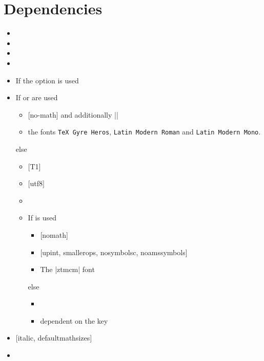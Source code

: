 \section{Dependencies}
\begin{multicols}{2}%
  \begin{itemize}[leftmargin=10pt]
    \item {}
    \item {}
    \item {}
    \item {}
    \item If the  option is used 
    \item If  or  are used
      \begin{itemize}[topsep=0pt]
        \item {} [no-math] and additionally
          \bverb||
        \item the fonts \texttt{TeX Gyre Heros}, \texttt{Latin Mod\-ern Roman}
          and \texttt{Latin Modern Mono}.
      \end{itemize}
      else
      \begin{itemize}[topsep=0pt]
        \item {} [T1]
        \item {} [utf8]
        \item {}
        \item If  is used
          \begin{itemize}[topsep=0pt]
            \item {} [nomath]
            \item {} [upint, smallerops, nosymbolsc, noamssymbols]
            \item The |ztmcm| font
          \end{itemize}
          else
          \begin{itemize}[topsep=0pt]
            \item {}
            \item {} dependent on the  key
          \end{itemize}
      \end{itemize}
    \item {} [italic, defaultmathsizes]
    \item {}
  \end{itemize}
\end{multicols}%

